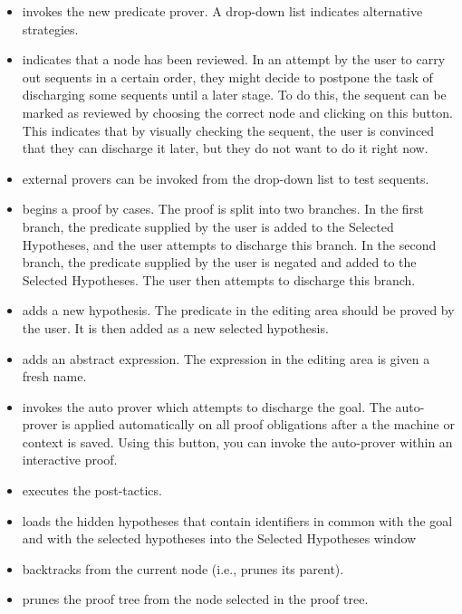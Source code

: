 \begin{itemize}
    \item {} invokes the new predicate prover. A drop-down list indicates alternative strategies.
    \item {} indicates that a node has been reviewed. In an attempt by the user to carry out sequents in a certain order, they might decide to postpone the task of discharging some sequents until a later stage. To do this, the sequent can be marked as reviewed by choosing the correct node and clicking on this button. This indicates that by visually checking the sequent, the user is convinced that they can discharge it later, but they do not want to do it right now.
    \item {} external provers can be invoked from the drop-down list to test sequents.
    \item {} begins a proof by cases. The proof is split into two branches. In the first branch, the predicate supplied by the user is added to the \textsf{Selected Hypotheses}, and the user attempts to discharge this branch. In the second branch, the predicate supplied by the user is negated and added to the \textsf{Selected Hypotheses}. The user then attempts to discharge this branch. 
    \item {} adds a new hypothesis. The predicate in the editing area should be proved by the user. It is then added as a new selected hypothesis.
    \item {} adds an abstract expression. The expression in the editing area is given a fresh name.
    \item {} invokes the auto prover which attempts to discharge the goal. The auto-prover is applied automatically on all proof obligations after a the machine or context is saved. Using this button, you can invoke the auto-prover within an interactive proof.
    \item {} executes the post-tactics.
    \item {} loads the hidden hypotheses that contain identifiers in common with the goal and with the selected hypotheses into the Selected Hypotheses window 
    \item {} backtracks from the current node (i.e., prunes its parent).
    \item {} prunes the proof tree from the node selected in the proof tree.

\end{itemize}
